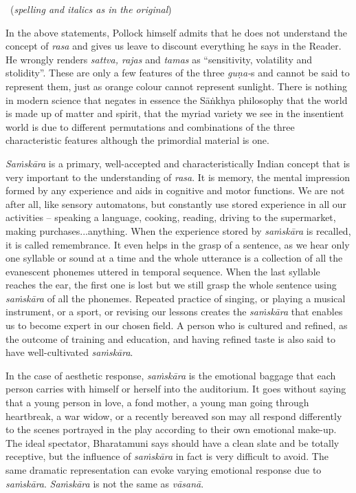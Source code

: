 \vspace{-.2cm}

\begin{myquote}

~\hfill (\textit{spelling and italics as in the original})
\end{myquote}

In the above statements, Pollock himself admits that he does not understand the concept of \textit{rasa }and gives us leave to discount everything he says in the Reader. He wrongly renders \textit{sattva, rajas} and \textit{tamas} as “sensitivity, volatility and stolidity”. These are only a few features of the three \textit{guṇa-}s and cannot be said to represent them, just as orange colour cannot represent sunlight. There is nothing in modern science that negates in essence the Sāṅkhya philosophy that the world is made up of matter and spirit, that the myriad variety we see in the insentient world is due to different permutations and combinations of the three characteristic features although the primordial material is one.

\newpage

\textit{Saṁskāra} is a primary, well-accepted and characteristically Indian concept that is very important to the understanding of \textit{rasa}. It is memory, the mental impression formed by any experience and aids in cognitive and motor functions. We are not after all, like sensory automatons, but constantly use stored experience in all our activities – speaking a language, cooking, reading, driving to the supermarket, making purchases...anything. When the experience stored by \textit{saṁskāra} is recalled, it is called remembrance. It even helps in the grasp of a sentence, as we hear only one syllable or sound at a time and the whole utterance is a collection of all the evanescent phonemes uttered in temporal sequence. When the last syllable reaches the ear, the first one is lost but we still grasp the whole sentence using \textit{saṁskāra} of all the phonemes. Repeated practice of singing, or playing a musical instrument, or a sport, or revising our lessons creates the \textit{saṁskāra} that enables us to become expert in our chosen field. A person who is cultured and refined, as the outcome of training and education, and having refined taste is also said to have well-cultivated \textit{saṁskāra}.

In the case of aesthetic response, \textit{saṁskāra} is the emotional baggage that each person carries with himself or herself into the auditorium. It goes without saying that a young person in love, a fond mother, a young man going through heartbreak, a war widow, or a recently bereaved son may all respond differently to the scenes portrayed in the play according to their own emotional make-up. The ideal spectator, Bharatamuni says should have a clean slate and be totally receptive, but the influence of \textit{saṁskāra} in fact is very difficult to avoid. The same dramatic representation can evoke varying emotional response due to \textit{saṁskāra}. \textit{Saṁskāra} is not the same as \textit{vāsanā}.

